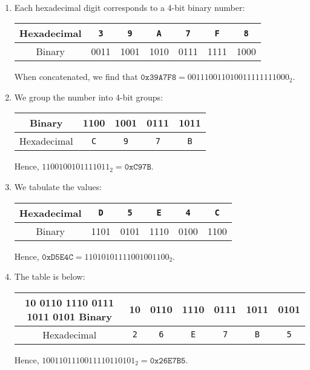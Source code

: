 \documentclass[12pt]{article}
\newenvironment{sol}[1][Solution]{\begin{trivlist}
		\item[\hskip \labelsep {\bfseries #1:}]}{\end{trivlist}}
\begin{document}
\begin{sol}
	\
	\begin{enumerate}[label=(\alph*)]
		\item Each hexadecimal digit corresponds to a 4-bit binary number:
		\begin{center}
			\begin{tabular}{c|cccccc}
				Hexadecimal & \texttt{3} & \texttt{9} & \texttt{A} & \texttt{7} & \texttt{F} & \texttt{8}\\
				\hline
				Binary & 0011 & 1001 & 1010 & 0111 & 1111 & 1000
			\end{tabular}
		\end{center}
		When concatenated, we find that $\texttt{0x39A7F8}=0011 1001 1010 0111 1111 1000_2$.
		\item We group the number into 4-bit groups:
		\begin{center}
			\begin{tabular}{c|cccc}
				Binary      & 1100 & 1001 & 0111 & 1011\\
				\hline
				Hexadecimal & \texttt{C} &  \texttt{9} &  \texttt{7} &  \texttt{B}
			\end{tabular}
		\end{center}
		Hence, $1100 1001 0111 1011_2=\texttt{0xC97B}$.
		\item We tabulate the values:
		\begin{center}
			\begin{tabular}{c|ccccc}
				Hexadecimal & \texttt{D} & \texttt{5} & \texttt{E} & \texttt{4} & \texttt{C} \\
				\hline
				Binary & 1101 & 0101 & 1110 & 0100 & 1100
			\end{tabular}
		\end{center}
		Hence, $\texttt{0xD5E4C}=1101 0101 1110 0100 1100_2$.
		\item The table is below:
		\begin{center}
			\begin{tabular}{c|cccccc}
				10 0110 1110 0111 1011 0101
				Binary      & 10 & 0110 & 1110 & 0111 & 1011 & 0101\\
				\hline
				Hexadecimal & \texttt{2} & \texttt{6} & \texttt{E} & \texttt{7} & \texttt{B} & \texttt{5}
			\end{tabular}
		\end{center}
		Hence, $10 0110 1110 0111 1011 0101_2=\texttt{0x26E7B5}$.
	\end{enumerate}
\end{sol}
\end{document}
